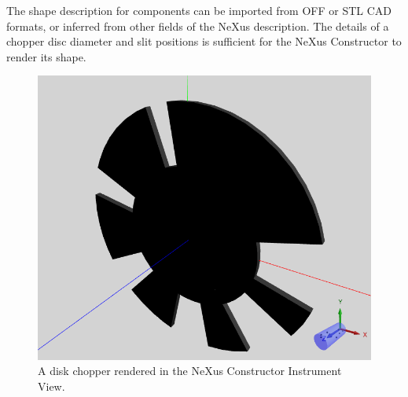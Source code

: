 The shape description for components can be imported from OFF or STL CAD formats, or inferred from other fields of the NeXus description.
The details of a chopper disc diameter and slit positions is sufficient for the NeXus Constructor to render its shape.

\begin{figure}
	\includegraphics[width=0.6\linewidth]{chopperinstrumentview.png}
	\caption{A disk chopper rendered in the NeXus Constructor Instrument View.}
\end{figure}
